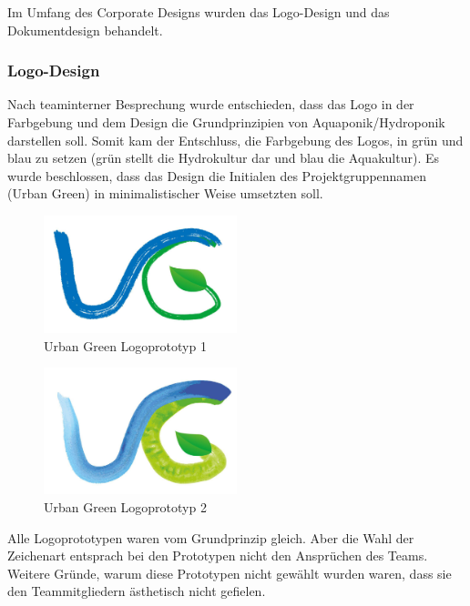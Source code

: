 Im Umfang des Corporate Designs wurden das Logo-Design und das Dokumentdesign behandelt.

\subsubsection{Logo-Design}
Nach teaminterner Besprechung wurde entschieden, dass das Logo in der Farbgebung und dem Design die Grundprinzipien von Aquaponik/Hydroponik darstellen soll. Somit kam der Entschluss, die Farbgebung des Logos, in grün und blau zu setzen (grün stellt die Hydrokultur dar und blau die Aquakultur). Es wurde beschlossen, dass das Design die Initialen des Projektgruppennamen (Urban Green) in minimalistischer Weise umsetzten soll.\\

\begin{figure}[ht]
    \centering
    \includegraphics[width=0.5\textwidth]{images/ug_Logoproto_1}
	\caption{Urban Green Logoprototyp 1}
\end{figure}

\begin{figure}[ht]
    \centering
	\includegraphics[width=0.5\textwidth]{images/ug_Logoproto_2}
	\caption{Urban Green Logoprototyp 2}
\end{figure}

Alle Logoprototypen waren vom Grundprinzip gleich. Aber die Wahl der Zeichenart entsprach bei den Prototypen nicht den Ansprüchen des Teams. Weitere Gründe, warum diese Prototypen nicht gewählt wurden waren, dass sie den Teammitgliedern ästhetisch nicht gefielen.\\

